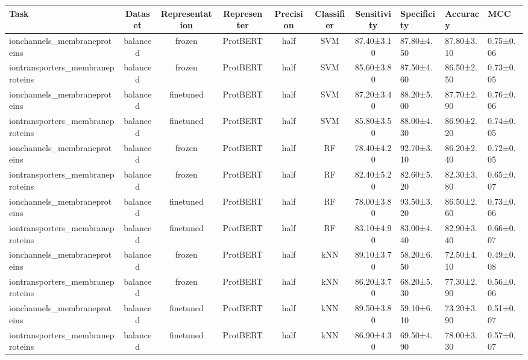 \begin{tabular}{lcccccc}
\toprule
                            Task &    Dataset & Representation &  Representer & Precision & Classifier & Sensitivity & Specificity &    Accuracy &       MCC \\
\midrule
    ionchannels\_membraneproteins &   balanced &         frozen &     ProtBERT &      half &        SVM &  87.40±3.10 &  87.80±4.50 &  87.80±3.10 & 0.75±0.06 \\
iontransporters\_membraneproteins &   balanced &         frozen &     ProtBERT &      half &        SVM &  85.60±3.80 &  87.50±4.60 &  86.50±2.50 & 0.73±0.05 \\
    ionchannels\_membraneproteins &   balanced &      finetuned &     ProtBERT &      half &        SVM &  87.20±3.40 &  88.20±5.00 &  87.70±2.90 & 0.76±0.06 \\
iontransporters\_membraneproteins &   balanced &      finetuned &     ProtBERT &      half &        SVM &  85.80±3.50 &  88.00±4.30 &  86.90±2.20 & 0.74±0.05 \\
    ionchannels\_membraneproteins &   balanced &         frozen &     ProtBERT &      half &         RF &  78.40±4.20 &  92.70±3.10 &  86.20±2.40 & 0.72±0.05 \\
iontransporters\_membraneproteins &   balanced &         frozen &     ProtBERT &      half &         RF &  82.40±5.20 &  82.60±5.20 &  82.30±3.80 & 0.65±0.07 \\
    ionchannels\_membraneproteins &   balanced &      finetuned &     ProtBERT &      half &         RF &  78.00±3.80 &  93.50±3.20 &  86.50±2.60 & 0.73±0.06 \\
iontransporters\_membraneproteins &   balanced &      finetuned &     ProtBERT &      half &         RF &  83.10±4.90 &  83.00±4.40 &  82.90±3.40 & 0.66±0.07 \\
    ionchannels\_membraneproteins &   balanced &         frozen &     ProtBERT &      half &        kNN &  89.10±3.70 &  58.20±6.50 &  72.50±4.10 & 0.49±0.08 \\
iontransporters\_membraneproteins &   balanced &         frozen &     ProtBERT &      half &        kNN &  86.20±3.70 &  68.20±5.30 &  77.30±2.90 & 0.56±0.06 \\
    ionchannels\_membraneproteins &   balanced &      finetuned &     ProtBERT &      half &        kNN &  89.50±3.80 &  59.10±6.10 &  73.20±3.90 & 0.51±0.07 \\
iontransporters\_membraneproteins &   balanced &      finetuned &     ProtBERT &      half &        kNN &  86.90±4.30 &  69.50±4.90 &  78.00±3.30 & 0.57±0.07 \\

\end{tabular}
